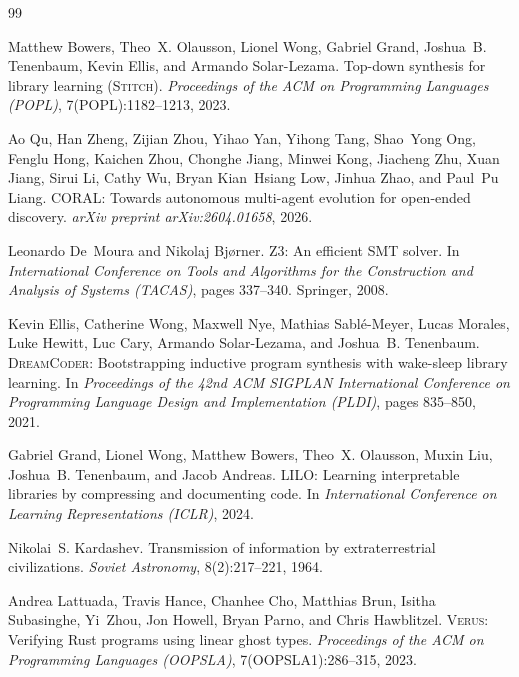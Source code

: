 \documentclass[10pt,twocolumn]{article}
\begin{document}
\begin{thebibliography}{99}

Matthew Bowers, Theo~X. Olausson, Lionel Wong, Gabriel Grand, Joshua~B. Tenenbaum, Kevin Ellis, and Armando Solar-Lezama.
\newblock Top-down synthesis for library learning (\textsc{Stitch}).
\newblock \emph{Proceedings of the ACM on Programming Languages (POPL)}, 7(POPL):1182--1213, 2023.

Ao Qu, Han Zheng, Zijian Zhou, Yihao Yan, Yihong Tang, Shao~Yong Ong, Fenglu Hong, Kaichen Zhou, Chonghe Jiang, Minwei Kong, Jiacheng Zhu, Xuan Jiang, Sirui Li, Cathy Wu, Bryan Kian~Hsiang Low, Jinhua Zhao, and Paul~Pu Liang.
\newblock \textsc{CORAL}: Towards autonomous multi-agent evolution for open-ended discovery.
\newblock \emph{arXiv preprint arXiv:2604.01658}, 2026.

Leonardo De~Moura and Nikolaj Bj{\o}rner.
\newblock Z3: An efficient SMT solver.
\newblock In \emph{International Conference on Tools and Algorithms for the Construction and Analysis of Systems (TACAS)}, pages 337--340. Springer, 2008.

Kevin Ellis, Catherine Wong, Maxwell Nye, Mathias Sabl{\'e}-Meyer, Lucas Morales, Luke Hewitt, Luc Cary, Armando Solar-Lezama, and Joshua~B. Tenenbaum.
\newblock \textsc{DreamCoder}: Bootstrapping inductive program synthesis with wake-sleep library learning.
\newblock In \emph{Proceedings of the 42nd ACM SIGPLAN International Conference on Programming Language Design and Implementation (PLDI)}, pages 835--850, 2021.

Gabriel Grand, Lionel Wong, Matthew Bowers, Theo~X. Olausson, Muxin Liu, Joshua~B. Tenenbaum, and Jacob Andreas.
\newblock \textsc{LILO}: Learning interpretable libraries by compressing and documenting code.
\newblock In \emph{International Conference on Learning Representations (ICLR)}, 2024.

Nikolai~S. Kardashev.
\newblock Transmission of information by extraterrestrial civilizations.
\newblock \emph{Soviet Astronomy}, 8(2):217--221, 1964.

Andrea Lattuada, Travis Hance, Chanhee Cho, Matthias Brun, Isitha Subasinghe, Yi~Zhou, Jon Howell, Bryan Parno, and Chris Hawblitzel.
\newblock \textsc{Verus}: Verifying Rust programs using linear ghost types.
\newblock \emph{Proceedings of the ACM on Programming Languages (OOPSLA)}, 7(OOPSLA1):286--315, 2023.


\end{thebibliography}
\end{document}
